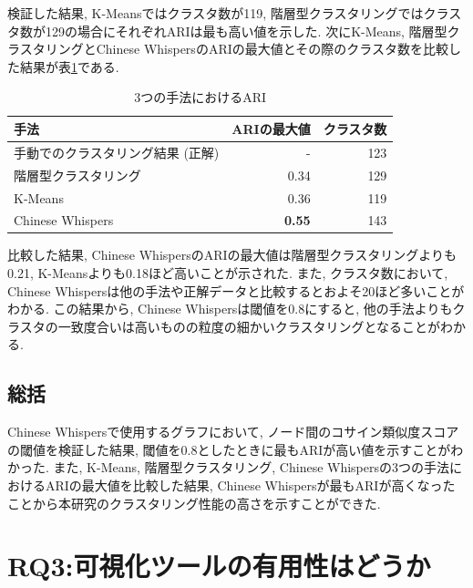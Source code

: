 検証した結果, K-Meansではクラスタ数が119, 階層型クラスタリングではクラスタ数が129の場合にそれぞれARIは最も高い値を示した. 次にK-Means, 階層型クラスタリングとChinese WhispersのARIの最大値とその際のクラスタ数を比較した結果が表\ref{tb:two_ari}である. 

\begin{table}[H]
  \caption{3つの手法におけるARI}
  \label{tb:two_ari}
  \begin{center}
  \begin{tabularx}{\linewidth}{X|r|r}
    \hline
    手法&ARIの最大値&クラスタ数\\\hline\hline
    手動でのクラスタリング結果 (正解) &-&123\\\hline
    階層型クラスタリング&0.34&129\\\hline
    K-Means&0.36&119\\\hline
    Chinese Whispers&\textbf{0.55}&143\\\hline
  \end{tabularx}\end{center}
\end{table}

比較した結果, Chinese WhispersのARIの最大値は階層型クラスタリングよりも0.21, K-Meansよりも0.18ほど高いことが示された. また, クラスタ数において, Chinese Whispersは他の手法や正解データと比較するとおよそ20ほど多いことがわかる. 
この結果から, Chinese Whispersは閾値を0.8にすると, 他の手法よりもクラスタの一致度合いは高いものの粒度の細かいクラスタリングとなることがわかる. 

\subsection{総括}
Chinese Whispersで使用するグラフにおいて, ノード間のコサイン類似度スコアの閾値を検証した結果, 閾値を0.8としたときに最もARIが高い値を示すことがわかった. 
また, K-Means, 階層型クラスタリング, Chinese Whispersの3つの手法におけるARIの最大値を比較した結果, Chinese Whispersが最もARIが高くなったことから本研究のクラスタリング性能の高さを示すことができた. 



\section{RQ3:可視化ツールの有用性はどうか}
